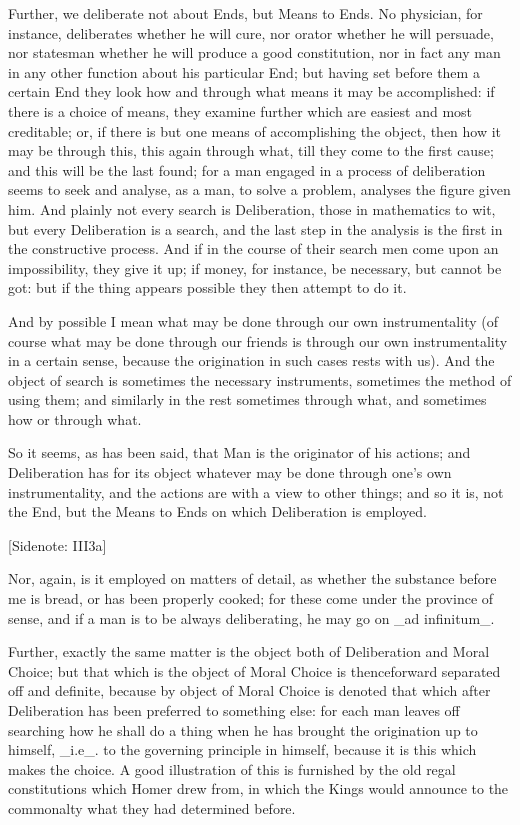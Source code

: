 Further, we deliberate not about Ends, but Means to Ends. No physician,
for instance, deliberates whether he will cure, nor orator whether
he will persuade, nor statesman whether he will produce a good
constitution, nor in fact any man in any other function about his
particular End; but having set before them a certain End they look how
and through what means it may be accomplished: if there is a choice of
means, they examine further which are easiest and most creditable; or,
if there is but one means of accomplishing the object, then how it may
be through this, this again through what, till they come to the first
cause; and this will be the last found; for a man engaged in a process
of deliberation seems to seek and analyse, as a man, to solve a
problem, analyses the figure given him. And plainly not every search is
Deliberation, those in mathematics to wit, but every Deliberation is
a search, and the last step in the analysis is the first in the
constructive process. And if in the course of their search men come upon
an impossibility, they give it up; if money, for instance, be necessary,
but cannot be got: but if the thing appears possible they then attempt
to do it.

And by possible I mean what may be done through our own instrumentality
(of course what may be done through our friends is through our own
instrumentality in a certain sense, because the origination in such
cases rests with us). And the object of search is sometimes the
necessary instruments, sometimes the method of using them; and similarly
in the rest sometimes through what, and sometimes how or through what.

So it seems, as has been said, that Man is the originator of his
actions; and Deliberation has for its object whatever may be done
through one's own instrumentality, and the actions are with a view to
other things; and so it is, not the End, but the Means to Ends on which
Deliberation is employed.

[Sidenote: III3a]

Nor, again, is it employed on matters of detail, as whether the
substance before me is bread, or has been properly cooked; for these
come under the province of sense, and if a man is to be always
deliberating, he may go on _ad infinitum_.

Further, exactly the same matter is the object both of Deliberation
and Moral Choice; but that which is the object of Moral Choice is
thenceforward separated off and definite, because by object of Moral
Choice is denoted that which after Deliberation has been preferred to
something else: for each man leaves off searching how he shall do a
thing when he has brought the origination up to himself, _i.e_. to the
governing principle in himself, because it is this which makes the
choice. A good illustration of this is furnished by the old regal
constitutions which Homer drew from, in which the Kings would announce
to the commonalty what they had determined before.

